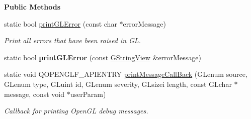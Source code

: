 \begin{Indent}\textbf{ Public Methods}\par
\begin{DoxyCompactItemize}
\item 
\mbox{\label{classrev_1_1_g_l_1_1_open_g_l_functions_a080dd5199fa24fdfb2f928a39eafaf59}} 
static bool \mbox{\hyperlink{classrev_1_1_g_l_1_1_open_g_l_functions_a080dd5199fa24fdfb2f928a39eafaf59}{print\+G\+L\+Error}} (const char $\ast$error\+Message)
\begin{DoxyCompactList}\small\item\em Print all errors that have been raised in GL. \end{DoxyCompactList}\item 
\mbox{\label{classrev_1_1_g_l_1_1_open_g_l_functions_a11b37c13e9ca7e1666993ace9826a755}} 
static bool {\bfseries print\+G\+L\+Error} (const \mbox{\hyperlink{classrev_1_1_g_string_view}{G\+String\+View}} \&error\+Message)
\item 
\mbox{\label{classrev_1_1_g_l_1_1_open_g_l_functions_ac20de746e43112c7ca67528c6e30526c}} 
static void Q\+O\+P\+E\+N\+G\+L\+F\+\_\+\+A\+P\+I\+E\+N\+T\+RY \mbox{\hyperlink{classrev_1_1_g_l_1_1_open_g_l_functions_ac20de746e43112c7ca67528c6e30526c}{print\+Message\+Call\+Back}} (G\+Lenum source, G\+Lenum type, G\+Luint id, G\+Lenum severity, G\+Lsizei length, const G\+Lchar $\ast$message, const void $\ast$user\+Param)
\begin{DoxyCompactList}\small\item\em Callback for printing Open\+GL debug messages. \end{DoxyCompactList}\end{DoxyCompactItemize}
\end{Indent}

